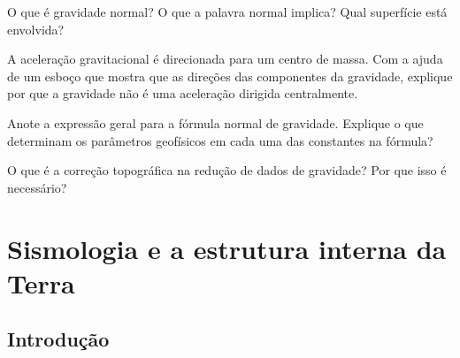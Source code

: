 \documentclass[]{book}
\theoremstyle{definition}
\theoremstyle{definition}
\theoremstyle{definition}
\theoremstyle{remark}
\let\BeginKnitrBlock\begin \let\EndKnitrBlock\end
\begin{document}
\BeginKnitrBlock{exercise}
\protect\hypertarget{exr:exr5}{}{\label{exr:exr5} }O que é gravidade normal? O que a palavra normal implica? Qual superfície está envolvida?
\EndKnitrBlock{exercise}

\BeginKnitrBlock{exercise}
\protect\hypertarget{exr:exr6}{}{\label{exr:exr6} }A aceleração gravitacional é direcionada para um centro de massa. Com a ajuda de um esboço que mostra que as direções das componentes da gravidade, explique por que a gravidade não é uma aceleração dirigida centralmente.
\EndKnitrBlock{exercise}

\BeginKnitrBlock{exercise}
\protect\hypertarget{exr:exr7}{}{\label{exr:exr7} }Anote a expressão geral para a fórmula normal de gravidade. Explique o que determinam os parâmetros geofísicos em cada uma das constantes na fórmula?
\EndKnitrBlock{exercise}

\BeginKnitrBlock{exercise}
\protect\hypertarget{exr:exr8}{}{\label{exr:exr8} }O que é a correção topográfica na redução de dados de gravidade? Por que isso é necessário?
\EndKnitrBlock{exercise}

\hypertarget{cap03}{%
\chapter{Sismologia e a estrutura interna da Terra}\label{cap03}}

\hypertarget{introducao-1}{%
\section{Introdução}\label{introducao-1}}
\end{document}
